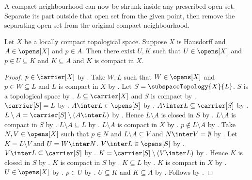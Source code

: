 A compact neighbourhood can now be shrunk inside any prescribed open set.
Separate its part outside that open set from the given point, then remove
the separating open set from the original compact neighbourhood.

\begin{theorem}\label{locally_compact_hausdorff_compact_neighbourhood_in_open}
    Let $X$ be a locally compact topological space.
    Suppose $X$ is Hausdorff and $A\in\opens[X]$ and $p\in A$.
    Then there exist $U,K$ such that $U\in\opens[X]$ and
        $p\in U\subseteq K$ and $K\subseteq A$ and $K$ is compact in $X$.
\end{theorem}
\begin{proof}
    $p\in\carrier[X]$ by .
    Take $W,L$ such that $W\in\opens[X]$ and $p\in W\subseteq L$ and
        $L$ is compact in $X$ by .
    Let $S=\subspaceTopology{X}{L}$.
    $S$ is a topological space by .
    $L\subseteq\carrier[X]$ and $S$ is compact by .
    $\carrier[S]=L$ by .
    $A\inter L\in\opens[S]$ by .
    $A\inter L\subseteq\carrier[S]$ by .
    $L\setminus A=\carrier[S]\setminus(A\inter L)$ by .
    Hence $L\setminus A$ is closed in $S$ by
        .
    $L\setminus A$ is compact in $S$ by .
    $L\setminus A\subseteq L$ by .
    $L\setminus A$ is compact in $X$ by .
    $p\notin L\setminus A$ by .
    Take $N,V\in\opens[X]$ such that $p\in N$ and
        $L\setminus A\subseteq V$ and $N\inter V=\emptyset$ by
        .
    Let $K=L\setminus V$ and $U=W\inter N$.
    $V\inter L\in\opens[S]$ by .
    $V\inter L\subseteq\carrier[S]$ by .
    $K=\carrier[S]\setminus(V\inter L)$ by .
    Hence $K$ is closed in $S$ by .
    $K$ is compact in $S$ by .
    $K\subseteq L$ by .
    $K$ is compact in $X$ by .
    $U\in\opens[X]$ by .
    $p\in U$ by .
    $U\subseteq K$ and $K\subseteq A$ by .
    Follows by \auto.
\end{proof}


